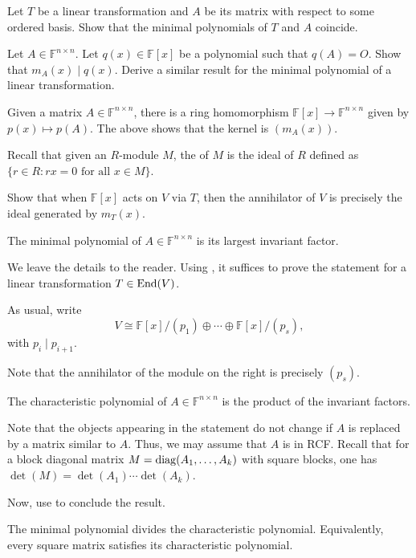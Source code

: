 \documentclass[12pt]{article}
\begin{document}
\begin{exe} \label{exe:T-and-A-same-minimal}
	Let $T$ be a linear transformation and $A$ be its matrix with respect to some ordered basis. Show that the minimal polynomials of $T$ and $A$ coincide.
\end{exe}

\begin{exe}
	Let $A \in \mathbb{F}^{n \times n}$. Let $q(x) \in \mathbb{F}[x]$ be a polynomial such that $q(A) = O$. Show that $m_{A}(x) \mid q(x)$. \newline
	Derive a similar result for the minimal polynomial of a linear transformation.
\end{exe}

Given a matrix $A \in \mathbb{F}^{n \times n}$, there is a ring homomorphism $\mathbb{F}[x] \to \mathbb{F}^{n \times n}$ given by $p(x) \mapsto p(A)$. The above shows that the kernel is $(m_{A}(x))$.

\begin{exe}
	Recall that given an $R$-module $M$, the  of $M$ is the ideal of $R$ defined as $\{r \in R : rx = 0 \text{ for all $x \in M$}\}$. 

	Show that when $\mathbb{F}[x]$ acts on $V$ via $T$, then the annihilator of $V$ is precisely the ideal generated by $m_{T}(x)$.
\end{exe}

\begin{thm}
	The minimal polynomial of $A \in \mathbb{F}^{n \times n}$ is its largest invariant factor.
\end{thm}
\begin{sketch}
	We leave the details to the reader. Using , it suffices to prove the statement for a linear transformation $T \in \operatorname{End}(V)$. 

	As usual, write 
	\begin{equation*} 
		V \cong \mathbb{F}[x]/(p_{1}) \oplus \cdots \oplus \mathbb{F}[x]/(p_{s}),
	\end{equation*} 
	with $p_{i} \mid p_{i + 1}$.

	Note that the annihilator of the module on the right is precisely $(p_{s})$.
\end{sketch}

\begin{thm}
	The characteristic polynomial of $A \in \mathbb{F}^{n \times n}$ is the product of the invariant factors.
\end{thm}
\begin{sketch}
	Note that the objects appearing in the statement do not change if $A$ is replaced by a matrix similar to $A$. Thus, we may assume that $A$ is in RCF. Recall that for a block diagonal matrix $M = \operatorname{diag}(A_{1}, \ldots, A_{k})$ with square blocks, one has $\det(M) = \det(A_{1}) \cdots \det(A_{k})$. 

	Now, use  to conclude the result.
\end{sketch}

\begin{cor}
	The minimal polynomial divides the characteristic polynomial. Equivalently, every square matrix satisfies its characteristic polynomial.
\end{cor}

\printbibliography
\end{document}
